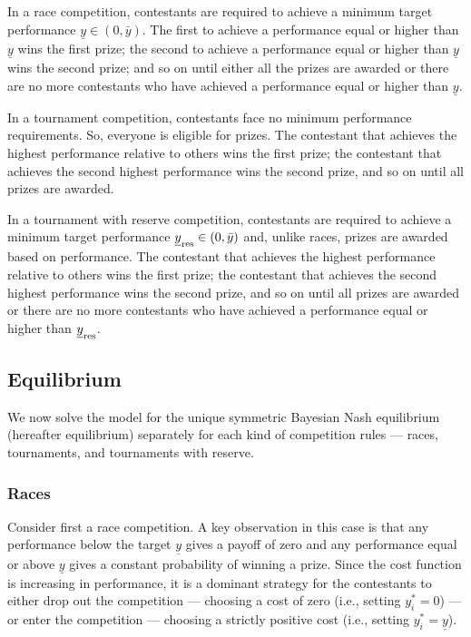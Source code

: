 \documentclass[10pt, titlepage]{article}
\newcommand\target{\underline{y}}
\begin{document}
\begin{definition}[Races]
In a race competition, contestants are required to achieve a minimum target performance $\target\in(0, \bar y)$. The first to achieve a performance equal or higher than $\target$ wins the first prize; the second to achieve a performance equal or higher than $\target$ wins the second prize; and so on until either all the prizes are awarded or there are no more contestants who have achieved a performance equal or higher than $\target$.
\end{definition}

\begin{definition}[Tournaments]
In a tournament competition, contestants face no minimum performance requirements. So, everyone is eligible for prizes. The contestant that achieves the highest performance relative to others wins the first prize; the contestant that achieves the second highest performance wins the second prize, and so on until all prizes are awarded.
\end{definition}

\begin{definition}
In a tournament with reserve competition, contestants are required to achieve a minimum target performance $\target_{\reserve}\in(0,\bar y)$ and, unlike races, prizes are awarded based on performance. The contestant that achieves the highest performance relative to others wins the first prize; the contestant that achieves the second highest performance wins the second prize, and so on until all prizes are awarded  or there are no more contestants who have achieved a performance equal or higher than $\target_{\reserve}$.
\end{definition}

\subsection{Equilibrium}\label{equilibrium}

We now solve the model for the unique symmetric Bayesian Nash
equilibrium (hereafter equilibrium) separately for each kind of
competition rules --- races, tournaments, and tournaments with reserve.

\subsubsection{Races}\label{races}

Consider first a race competition. A key observation in this case is
that any performance below the target \(\target\) gives a payoff of zero
and any performance equal or above \(\target\) gives a constant
probability of winning a prize. Since the cost function is increasing in
performance, it is a dominant strategy for the contestants to either
drop out the competition --- choosing a cost of zero (i.e., setting
\(y_i^*=0\)) --- or enter the competition --- choosing a strictly
positive cost (i.e., setting \(y_i^*=\target\)).
\end{document}
